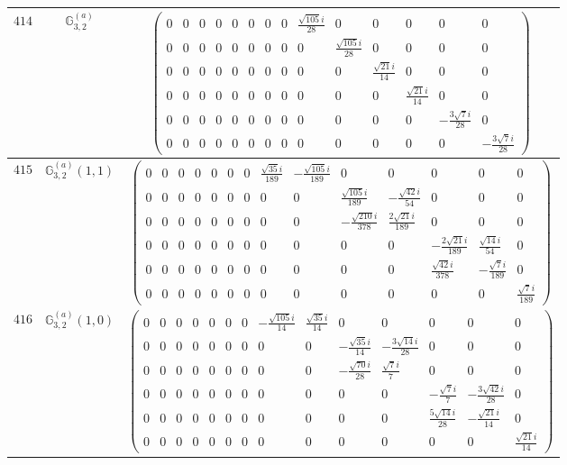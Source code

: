 \documentclass[fleqn,8pt,landscape]{jsarticle}
\begin{document}
\begin{center}
\begin{longtable}{ccc}
$ 414 $ & $ \mathbb{G}_{3,2}^{(a)} $ & $ \begin{pmatrix} 0 & 0 & 0 & 0 & 0 & 0 & 0 & 0 & \frac{\sqrt{105} i}{28} & 0 & 0 & 0 & 0 & 0 \\ 0 & 0 & 0 & 0 & 0 & 0 & 0 & 0 & 0 & \frac{\sqrt{105} i}{28} & 0 & 0 & 0 & 0 \\ 0 & 0 & 0 & 0 & 0 & 0 & 0 & 0 & 0 & 0 & \frac{\sqrt{21} i}{14} & 0 & 0 & 0 \\ 0 & 0 & 0 & 0 & 0 & 0 & 0 & 0 & 0 & 0 & 0 & \frac{\sqrt{21} i}{14} & 0 & 0 \\ 0 & 0 & 0 & 0 & 0 & 0 & 0 & 0 & 0 & 0 & 0 & 0 & - \frac{3 \sqrt{7} i}{28} & 0 \\ 0 & 0 & 0 & 0 & 0 & 0 & 0 & 0 & 0 & 0 & 0 & 0 & 0 & - \frac{3 \sqrt{7} i}{28} \end{pmatrix} $ \\ \hline
$ 415 $ & $ \mathbb{G}_{3,2}^{(a)}(1,1) $ & $ \begin{pmatrix} 0 & 0 & 0 & 0 & 0 & 0 & 0 & \frac{\sqrt{35} i}{189} & - \frac{\sqrt{105} i}{189} & 0 & 0 & 0 & 0 & 0 \\ 0 & 0 & 0 & 0 & 0 & 0 & 0 & 0 & 0 & \frac{\sqrt{105} i}{189} & - \frac{\sqrt{42} i}{54} & 0 & 0 & 0 \\ 0 & 0 & 0 & 0 & 0 & 0 & 0 & 0 & 0 & - \frac{\sqrt{210} i}{378} & \frac{2 \sqrt{21} i}{189} & 0 & 0 & 0 \\ 0 & 0 & 0 & 0 & 0 & 0 & 0 & 0 & 0 & 0 & 0 & - \frac{2 \sqrt{21} i}{189} & \frac{\sqrt{14} i}{54} & 0 \\ 0 & 0 & 0 & 0 & 0 & 0 & 0 & 0 & 0 & 0 & 0 & \frac{\sqrt{42} i}{378} & - \frac{\sqrt{7} i}{189} & 0 \\ 0 & 0 & 0 & 0 & 0 & 0 & 0 & 0 & 0 & 0 & 0 & 0 & 0 & \frac{\sqrt{7} i}{189} \end{pmatrix} $ \\ \hline
$ 416 $ & $ \mathbb{G}_{3,2}^{(a)}(1,0) $ & $ \begin{pmatrix} 0 & 0 & 0 & 0 & 0 & 0 & 0 & - \frac{\sqrt{105} i}{14} & \frac{\sqrt{35} i}{14} & 0 & 0 & 0 & 0 & 0 \\ 0 & 0 & 0 & 0 & 0 & 0 & 0 & 0 & 0 & - \frac{\sqrt{35} i}{14} & - \frac{3 \sqrt{14} i}{28} & 0 & 0 & 0 \\ 0 & 0 & 0 & 0 & 0 & 0 & 0 & 0 & 0 & - \frac{\sqrt{70} i}{28} & \frac{\sqrt{7} i}{7} & 0 & 0 & 0 \\ 0 & 0 & 0 & 0 & 0 & 0 & 0 & 0 & 0 & 0 & 0 & - \frac{\sqrt{7} i}{7} & - \frac{3 \sqrt{42} i}{28} & 0 \\ 0 & 0 & 0 & 0 & 0 & 0 & 0 & 0 & 0 & 0 & 0 & \frac{5 \sqrt{14} i}{28} & - \frac{\sqrt{21} i}{14} & 0 \\ 0 & 0 & 0 & 0 & 0 & 0 & 0 & 0 & 0 & 0 & 0 & 0 & 0 & \frac{\sqrt{21} i}{14} \end{pmatrix} $ \\ \hline

\end{longtable}
\end{center}
\end{document}
